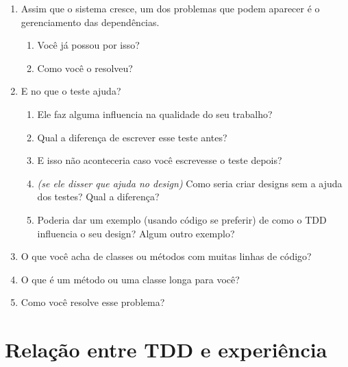 \begin{enumerate}
	\item Assim que o sistema cresce, um dos problemas que podem aparecer é o
	gerenciamento das dependências.
		
		\begin{enumerate}
		  \item Você já possou por isso?

		  \item Como você o resolveu?
		\end{enumerate}

	\item E no que o teste ajuda?
	\begin{enumerate}
		\item Ele faz alguma influencia na qualidade do seu trabalho?

		\item Qual a diferença de escrever esse teste antes?

		\item E isso não aconteceria caso você escrevesse o teste depois?

		\item \textit{(se ele disser que ajuda no design)} Como seria criar designs
		sem a ajuda dos testes? Qual a diferença?

		\item Poderia dar um exemplo (usando código se preferir) de como o TDD
		influencia o seu design? Algum outro exemplo?

	\end{enumerate}

	\item O que você acha de classes ou métodos com muitas linhas de código?

	\item O que é um método ou uma classe longa para você?

	\item Como você resolve esse problema?

\end{enumerate}

\section{Relação entre TDD e experiência}

